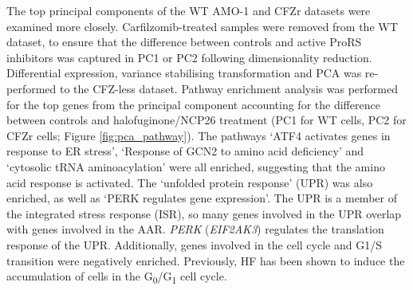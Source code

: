 The top principal components of the WT AMO-1 and CFZr datasets were examined more closely.
Carfilzomib-treated samples were removed from the WT dataset, to ensure that the difference between controls and active ProRS inhibitors was captured in PC1 or PC2 following dimensionality reduction.
Differential expression, variance stabilising transformation and PCA was re-performed to the CFZ-less dataset.
Pathway enrichment analysis was performed for the top genes from the principal component accounting for the difference between controls and halofuginone/NCP26 treatment (PC1 for WT cells, PC2 for CFZr cells; Figure \ref{fig:pca_pathway}).
The pathways `ATF4 activates genes in response to ER stress', `Response of GCN2 to amino acid deficiency' and `cytosolic tRNA aminoacylation' were all enriched, suggesting that the amino acid response is activated.
The `unfolded protein response' (UPR) was also enriched, as well as `PERK regulates gene expression'.
The UPR is a member of the integrated stress response (ISR), so many genes involved in the UPR overlap with genes involved in the AAR\@.
\textit{PERK} (\textit{EIF2AK3}) regulates the translation response of the UPR\@.
Additionally, genes involved in the cell cycle and G1/S transition were negatively enriched.
Previously, HF has been shown to induce the accumulation of cells in the G\textsubscript{0}/G\textsubscript{1} cell cycle\cite{leiba2012halofuginone}.

